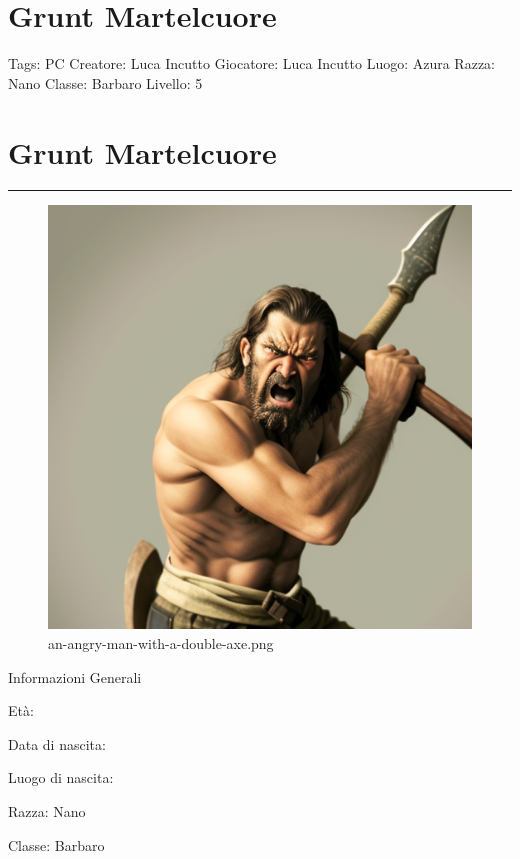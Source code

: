 \section{Grunt Martelcuore}\label{grunt-martelcuore}

Tags: PC Creatore: Luca Incutto Giocatore: Luca Incutto Luogo: Azura
Razza: Nano Classe: Barbaro Livello: 5

\section{Grunt Martelcuore}\label{grunt-martelcuore-1}

\begin{center}\rule{0.5\linewidth}{0.5pt}\end{center}

\begin{figure}
\centering
\includegraphics{an-angry-man-with-a-double-axe.png}
\caption{an-angry-man-with-a-double-axe.png}
\end{figure}

Informazioni Generali

Età:

Data di nascita:

Luogo di nascita:

Razza: Nano

Classe: Barbaro

